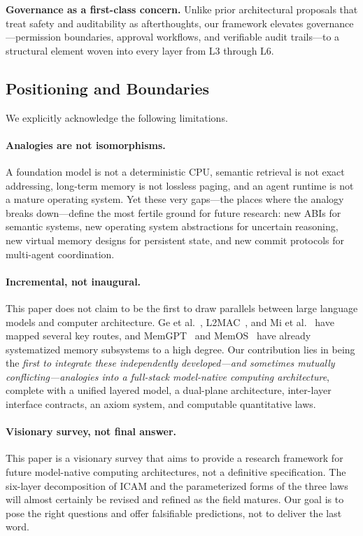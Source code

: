 \documentclass[11pt,a4paper]{article}
\newcounter{axiom}[section]
\begin{document}
\textbf{Governance as a first-class concern.}
Unlike prior architectural proposals that treat safety and auditability as afterthoughts, our framework elevates governance---permission boundaries, approval workflows, and verifiable audit trails---to a structural element woven into every layer from L3 through L6.

\subsection{Positioning and Boundaries}

We explicitly acknowledge the following limitations.

\paragraph{Analogies are not isomorphisms.}
A foundation model is not a deterministic CPU, semantic retrieval is not exact addressing, long-term memory is not lossless paging, and an agent runtime is not a mature operating system. Yet these very gaps---the places where the analogy breaks down---define the most fertile ground for future research: new ABIs for semantic systems, new operating system abstractions for uncertain reasoning, new virtual memory designs for persistent state, and new commit protocols for multi-agent coordination.

\paragraph{Incremental, not inaugural.}
This paper does not claim to be the first to draw parallels between large language models and computer architecture. Ge et al.~\cite{ge2023llmos}, L2MAC~\cite{holt2024l2mac}, and Mi et al.~\cite{mi2025llmagentscomputersystems} have mapped several key routes, and MemGPT~\cite{memgpt2023} and MemOS~\cite{memos2025} have already systematized memory subsystems to a high degree. Our contribution lies in being the \emph{first to integrate these independently developed---and sometimes mutually conflicting---analogies into a full-stack model-native computing architecture}, complete with a unified layered model, a dual-plane architecture, inter-layer interface contracts, an axiom system, and computable quantitative laws.

\paragraph{Visionary survey, not final answer.}
This paper is a visionary survey that aims to provide a research framework for future model-native computing architectures, not a definitive specification. The six-layer decomposition of ICAM and the parameterized forms of the three laws will almost certainly be revised and refined as the field matures. Our goal is to pose the right questions and offer falsifiable predictions, not to deliver the last word.
\end{document}

